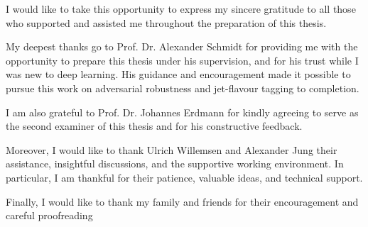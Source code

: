\documentclass[12pt]{caltech_thesis}
\begin{document}
\begin{acknowledgements}

I would like to take this opportunity to express my sincere gratitude to all those who supported and assisted me throughout the preparation of this thesis.

My deepest thanks go to Prof. Dr. Alexander Schmidt for providing me with the opportunity to prepare this thesis under his supervision, and for his trust while I was new to deep learning. His guidance and encouragement made it possible to pursue this work on adversarial robustness and jet-flavour tagging to completion.

I am also grateful to Prof. Dr. Johannes Erdmann for kindly agreeing to serve as the second examiner of this thesis and for his constructive feedback.

Moreover, I would like to thank Ulrich Willemsen and Alexander Jung their assistance, insightful discussions, and the supportive working environment. In particular, I am thankful for their patience, valuable ideas, and technical support.

Finally, I would like to thank my family and friends for their encouragement and careful proofreading

\end{acknowledgements}

\tableofcontents
\listoffigures
\listoftables
\glsaddall[types=\acronymtype]
\clearpage
{%
  \let\cleardoublepage\clearpage
  \printglossary[type=\acronymtype,nonumberlist,style=long]%
}

\mainmatter













\printbibliography

\appendix

\let\oldaddcontentsline\addcontentsline
\renewcommand{\addcontentsline}[3]{%
  \ifnum\pdfstrcmp{#2}{figure}=0
    \ifnum\value{chapter}>0
    \else
      \oldaddcontentsline{#1}{#2}{#3}%
    \fi
  \else
    \oldaddcontentsline{#1}{#2}{#3}%
  \fi
}
\end{document}
